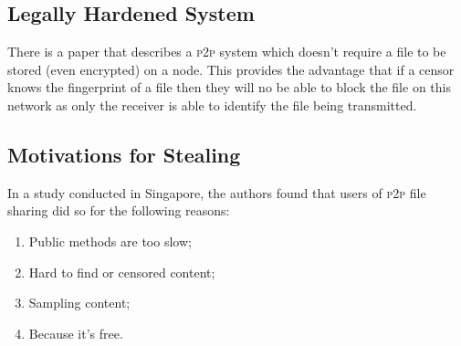 \subsection{Legally Hardened System}

There is a paper that describes a \textsc{p2p} system which doesn't require a
file to be stored (even encrypted) on a
node.\cite{CensorshipresistantAnonymousP2P} This provides the advantage that if
a censor knows the fingerprint of a file then they will no be able to block the
file on this network as only the receiver is able to identify the file being
transmitted.



\subsection{Motivations for Stealing}
In a study conducted in Singapore, the authors found that users of \textsc{p2p}
file sharing did so for the following reasons:\cite{MoreJustFree}
\begin{enumerate}[nosep]
      \item Public methods are too slow;
      \item Hard to find or censored content;
      \item Sampling content;
      \item Because it's free.
\end{enumerate}
